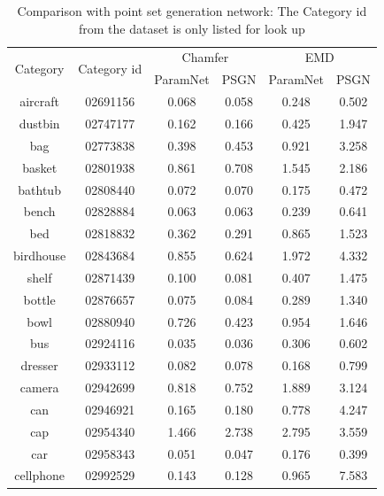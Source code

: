\begin{table}
	\caption{Comparison with point set generation network\cite{PSGN}: The Category id from the dataset\cite{shapenetdata} is only listed for look up}
	\label{tab:seg}
	\centering
	\begin{tabular}{c c c c c c}
		\multirow{2}{*}{Category} & \multirow{2}{*}{Category id} & \multicolumn{2}{c}{Chamfer} & \multicolumn{2}{c}{EMD}\\ \cmidrule(lr){3-4} \cmidrule(lr){5-6}
		&	& ParamNet & PSGN\cite{PSGN}       & ParamNet & PSGN\cite{PSGN}\\
		\hline
		aircraft & 02691156 & 0.068 & 0.058 & 0.248 & 0.502 \\   
		dustbin & 02747177 & 0.162 & 0.166 & 0.425 & 1.947 \\
		bag & 02773838  & 0.398 & 0.453 & 0.921 & 3.258 \\
		basket & 02801938 & 0.861 & 0.708 & 1.545 & 2.186 \\
		bathtub & 02808440 & 0.072 & 0.070 & 0.175 & 0.472 \\
		bench & 02828884 & 0.063 & 0.063 & 0.239 & 0.641 \\
		bed & 02818832 & 0.362 & 0.291 & 0.865 & 1.523 \\
		birdhouse & 02843684 & 0.855 & 0.624 & 1.972 & 4.332 \\
		shelf & 02871439 & 0.100 & 0.081 & 0.407 & 1.475 \\
		bottle & 02876657 & 0.075 & 0.084 & 0.289 & 1.340 \\
		bowl & 02880940 & 0.726 & 0.423 & 0.954 & 1.646 \\
		bus & 02924116 & 0.035 & 0.036 & 0.306 & 0.602\\
		dresser & 02933112 & 0.082 & 0.078 & 0.168 & 0.799 \\
		camera & 02942699 & 0.818 & 0.752 & 1.889 & 3.124 \\
		can & 02946921 & 0.165 & 0.180 & 0.778 & 4.247 \\
		cap & 02954340 & 1.466 & 2.738 & 2.795 & 3.559 \\
		car & 02958343 & 0.051 & 0.047 & 0.176 & 0.399 \\
		cellphone & 02992529 & 0.143  & 0.128  & 0.965  & 7.583 \\
		

\end{tabular}
\end{table}
